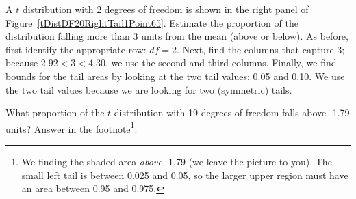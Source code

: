 \begin{example}{A $t$ distribution with 2 degrees of freedom is shown in the right panel of Figure~\ref{tDistDF20RightTail1Point65}. Estimate the proportion of the distribution falling more than 3 units from the mean (above or below).}
As before, first identify the appropriate row: $df=2$. Next, find the columns that capture 3; because $2.92 < 3 < 4.30$, we use the second and third columns. Finally, we find bounds for the tail areas by looking at the two tail values: 0.05 and 0.10. We use the two tail values because we are looking for two (symmetric) tails. %
\end{example}

\begin{exercise}
What proportion of the $t$ distribution with 19 degrees of freedom falls above -1.79 units? Answer in the footnote\footnote{We finding the shaded area \emph{above} -1.79 (we leave the picture to you). The small left tail is between 0.025 and 0.05, so the larger upper region must have an area between 0.95 and 0.975.}.
\end{exercise}




